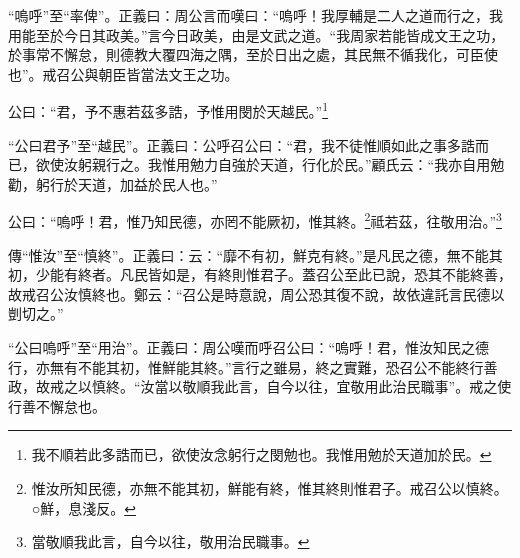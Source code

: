 {\noindent\shu{}\fzkt “嗚呼”至“率俾”。正義曰：周公言而嘆曰：“嗚呼！我厚輔是二人之道而行之，我用能至於今日其政美。”言今日政美，由是文武之道。“我周家若能皆成文王之功，於事常不懈怠，則德教大覆四海之隅，至於日出之處，其民無不循我化，可臣使也”。戒召公與朝臣皆當法文王之功。 \par}

公曰：“君，予不惠若茲多誥，予惟用閔於天越民。”\footnote{我不順若此多誥而已，欲使汝念躬行之閔勉也。我惟用勉於天道加於民。}

{\noindent\shu{}\fzkt “公曰君予”至“越民”。正義曰：公呼召公曰：“君，我不徒惟順如此之事多誥而已，欲使汝躬親行之。我惟用勉力自強於天道，行化於民。”顧氏云：“我亦自用勉勸，躬行於天道，加益於民人也。” \par}

公曰：“嗚呼！君，惟乃知民德，亦罔不能厥初，惟其終。\footnote{惟汝所知民德，亦無不能其初，鮮能有終，惟其終則惟君子。戒召公以慎終。○鮮，息淺反。}祗若茲，往敬用治。”\footnote{當敬順我此言，自今以往，敬用治民職事。}


{\noindent\zhuan{}\fzbyks 傳“惟汝”至“慎終”。正義曰：云：“靡不有初，鮮克有終。”是凡民之德，無不能其初，少能有終者。凡民皆如是，有終則惟君子。蓋召公至此已說，恐其不能終善，故戒召公汝慎終也。鄭云：“召公是時意說，周公恐其復不說，故依違託言民德以剴切之。” \par}

{\noindent\shu{}\fzkt “公曰嗚呼”至“用治”。正義曰：周公嘆而呼召公曰：“嗚呼！君，惟汝知民之德行，亦無有不能其初，惟鮮能其終。”言行之雖易，終之實難，恐召公不能終行善政，故戒之以慎終。“汝當以敬順我此言，自今以往，宜敬用此治民職事”。戒之使行善不懈怠也。 \par}

